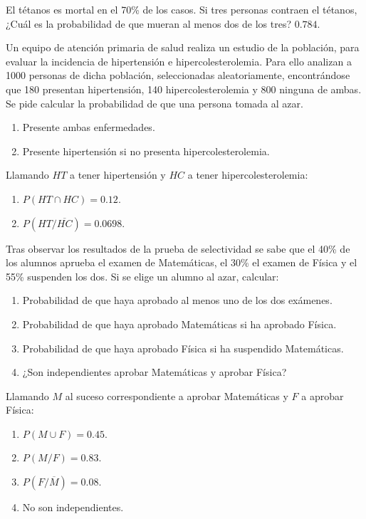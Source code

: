 {El tétanos es mortal en el 70\% de los casos.
Si tres personas contraen el tétanos, ¿Cuál es la probabilidad de que mueran al menos dos de los tres?
}
{$0.784$.}
{}


{Un equipo de atención primaria de salud realiza un estudio de la población, para evaluar la incidencia de hipertensión
e hipercolesterolemia.
Para ello analizan a 1000 personas de dicha población, seleccionadas aleatoriamente, encontrándose que 180 presentan
hipertensión, 140 hipercolesterolemia y 800 ninguna de ambas.
Se pide calcular la probabilidad de que una persona tomada al azar.
\begin{enumerate}
\item  Presente ambas enfermedades.
\item  Presente hipertensión si no presenta hipercolesterolemia.
\end{enumerate}
}
{Llamando $HT$ a tener hipertensión y $HC$ a tener hipercolesterolemia:
\begin{enumerate}
\item $P(HT\cap HC)=0.12.$
\item $P(HT/\overline{HC})=0.0698.$
\end{enumerate} 
}
{}


{Tras observar los resultados de la prueba de selectividad se sabe que el 40\% de los alumnos aprueba el examen de
Matemáticas, el 30\% el examen de Física y el 55\% suspenden los dos.
Si se elige un alumno al azar, calcular:
\begin{enumerate}
\item Probabilidad de que haya aprobado al menos uno de los dos exámenes.
\item Probabilidad de que haya aprobado Matemáticas si ha aprobado Física.
\item Probabilidad de que haya aprobado Física si ha suspendido Matemáticas.
\item ¿Son independientes aprobar Matemáticas y aprobar Física?
\end{enumerate}
}
{Llamando $M$ al suceso correspondiente a aprobar Matemáticas y $F$ a aprobar Física:
\begin{enumerate}
\item $P(M\cup F)=0.45$.
\item $P(M/F)=0.83$.
\item $P(F/\overline{M})=0.08$.
\item No son independientes.
\end{enumerate}
}
{}


